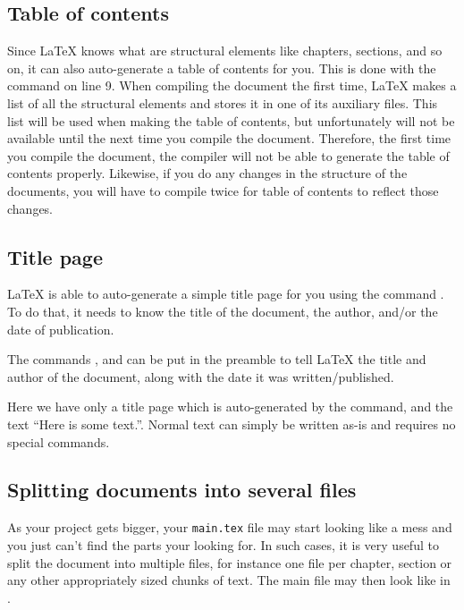 \subsection{Table of contents}
Since \LaTeX{} knows what are structural elements like chapters, sections, and so on, it can also auto-generate a table of contents for you. This is done with the \latexin{\tableofcontents} command on line 9. When compiling the document the first time, \LaTeX{} makes a list of all the structural elements and stores it in one of its auxiliary files. This list will be used when making the table of contents, but unfortunately will not be available until the next time you compile the document. Therefore, the first time you compile the document, the compiler will not be able to generate the table of contents properly. Likewise, if you do any changes in the structure of the documents, you will have to compile twice for table of contents to reflect those changes.

\subsection{Title page}
\LaTeX{} is able to auto-generate a simple title page for you using the command \latexin{\maketitle}. To do that, it needs to know the title of the document, the author, and/or the date of publication.

The commands \latexin{\title}, \latexin{\author} and \latexin{\date} can be put in the preamble to tell \LaTeX{} the title and author of the document, along with the date it was written/published.

 Here we have only a title page which is auto-generated by the \latexin{\maketitle} command, and the text ``Here is some text.''. Normal text can simply be written as-is and requires no special commands.
 
 \subsection{Splitting documents into several files}
As your project gets bigger, your \verb|main.tex| file may start looking like a mess and you just can't find the parts your looking for. In such cases, it is very useful to split the document into multiple files, for instance one file per chapter, section or any other appropriately sized chunks of text. The main file may then look like in .

